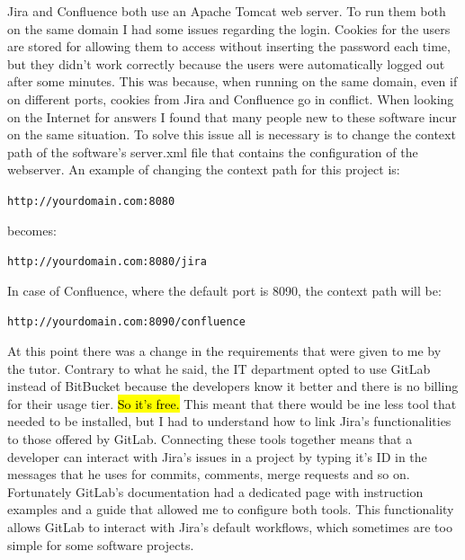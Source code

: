 	Jira and Confluence both use an Apache Tomcat web server.
	To run them both on the same domain I had some issues regarding the login.
	Cookies for the users are stored for allowing them to access without inserting the password each time, but they didn't work correctly because the users were automatically logged out after some minutes.
	This was because, when running on the same domain, even if on different ports, cookies from Jira and Confluence go in conflict.
	When looking on the Internet for answers I found that many people new to these software incur on the same situation.
	To solve this issue all is necessary is to change the context path of the software's server.xml file that contains the configuration of the webserver.
	An example of changing the context path for this project is:
	\begin{center}
		\texttt{http://yourdomain.com:8080}
	\end{center}
	becomes:
	\begin{center}
		\texttt{http://yourdomain.com:8080/jira}
	\end{center}
	In case of Confluence, where the default port is 8090, the context path will be:
	\begin{center}
		\texttt{http://yourdomain.com:8090/confluence}
	\end{center}
	At this point there was a change in the requirements that were given to me by the tutor.
	Contrary to what he said, the IT department opted to use GitLab instead of BitBucket because the developers know it better and there is no billing for their usage tier.
	\hl{So it's free.}
	This meant that there would be ine less tool that needed to be installed, but I had to understand how to link Jira's functionalities to those offered by GitLab.
	Connecting these tools together means that a developer can interact with Jira's issues in a project by typing it's ID in the messages that he uses for commits, comments, merge requests and so on.
	Fortunately GitLab's documentation had a dedicated page with instruction examples and a guide that allowed me to configure both tools.
	This functionality allows GitLab to interact with Jira's default workflows, which sometimes are too simple for some software projects.	
